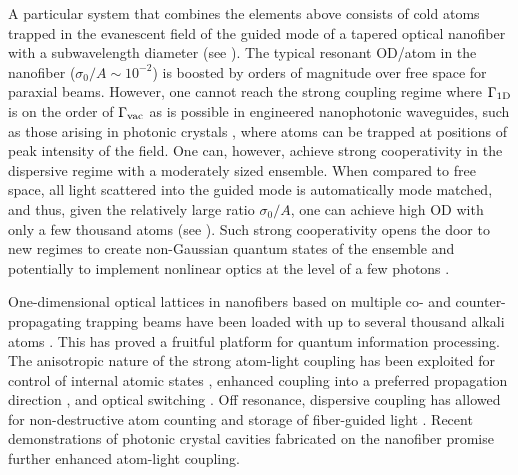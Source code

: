 \documentclass[preprint, aps,pra,onecolumn]{revtex4-1} %
\newcommand{\oneD}{{\rm 1D}}
\newcommand{\vac}{{\rm vac}}
\begin{document}
A particular system that combines the elements above consists of cold atoms trapped in the evanescent field of the guided mode of a tapered optical nanofiber with a subwavelength diameter \cite{vetsch_optical_2010, lacroute_state-insensitive_2012, balykin_quantum_2014, grover_photon-correlation_2015} (see ).  
The typical resonant OD/atom in the nanofiber ($\sigma_0/A \sim  10^{-2}$) is boosted by orders of magnitude over free space for paraxial beams. 
However, one cannot reach the strong coupling regime where $\Gamma_{\oneD}$ is on the order of $\Gamma_{\vac}$ as is possible in engineered nanophotonic waveguides, such as those arising in photonic crystals \cite{hung_trapped_2013}, where atoms can be trapped at positions of peak intensity of the field.  
One can, however, achieve strong cooperativity in the dispersive regime with a moderately sized ensemble.  When compared to free space, all light scattered into the guided mode is automatically mode matched, and thus, given the relatively large ratio $\sigma_0/A$, one can achieve high OD with only a few thousand atoms (see ).  
Such strong cooperativity opens the door to new regimes to create non-Gaussian quantum states of the ensemble \cite{dubost_efficient_2012} and potentially to implement nonlinear optics at the level of a few photons \cite{spillane_observation_2008, pittman_ultralow-power_2013, oshea_fiber-optical_2013}.


One-dimensional optical lattices in nanofibers based on multiple co- and counter-propagating trapping beams have been loaded with up to several thousand alkali atoms \cite{vetsch_optical_2010, lacroute_state-insensitive_2012}.
This has proved a fruitful platform for quantum information processing.  
The anisotropic nature of the strong atom-light coupling has been exploited for control of internal atomic states \cite{mitsch_exploiting_2014}, enhanced coupling into a preferred propagation direction \cite{petersen_chiral_2014, mitsch_quantum_2014}, and optical switching \cite{oshea_fiber-optical_2013}. 
Off resonance, dispersive coupling has allowed for non-destructive atom counting \cite{dawkins_dispersive_2011, beguin_generation_2014} 
and storage of fiber-guided light \cite{gouraud_demonstration_2015, sayrin_storage_2015}.
Recent demonstrations of photonic crystal cavities fabricated on the nanofiber \cite{wuttke_nanofiber_2012, nayak_optical_2014, schell_highly_2015} promise further enhanced atom-light coupling.
\end{document}
